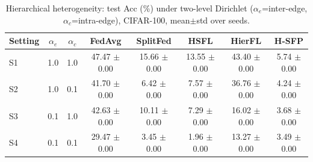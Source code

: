 \begin{table}[t]
\centering
\caption{Hierarchical heterogeneity: test Acc (\%) under two-level Dirichlet ($\alpha_e$=inter-edge, $\alpha_c$=intra-edge), CIFAR-100, mean$\pm$std over seeds.}
\label{tab:hetero}
\begin{tabular}{lccccccc}
\toprule
Setting & $\alpha_{e}$ & $\alpha_{c}$ & FedAvg & SplitFed & HSFL & HierFL & H-SFP \\
\midrule
S1 & 1.0 & 1.0 & 47.47 $\pm$ 0.00 & 15.66 $\pm$ 0.00 & 13.55 $\pm$ 0.00 & 43.40 $\pm$ 0.00 & 5.74 $\pm$ 0.00 \\
S2 & 1.0 & 0.1 & 41.70 $\pm$ 0.00 & 6.42 $\pm$ 0.00 & 7.57 $\pm$ 0.00 & 36.76 $\pm$ 0.00 & 4.24 $\pm$ 0.00 \\
S3 & 0.1 & 1.0 & 42.63 $\pm$ 0.00 & 10.11 $\pm$ 0.00 & 7.29 $\pm$ 0.00 & 16.02 $\pm$ 0.00 & 3.68 $\pm$ 0.00 \\
S4 & 0.1 & 0.1 & 29.47 $\pm$ 0.00 & 3.45 $\pm$ 0.00 & 1.96 $\pm$ 0.00 & 13.27 $\pm$ 0.00 & 3.49 $\pm$ 0.00 \\
\bottomrule
\end{tabular}
\end{table}
